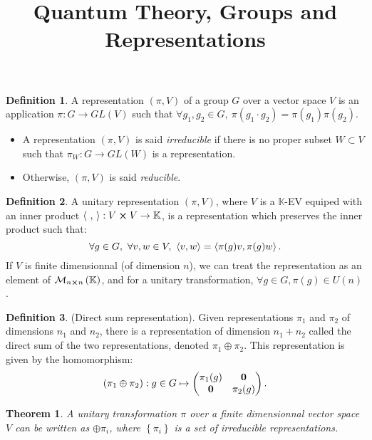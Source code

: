\documentclass[11pt,a4paper]{article}
\title{Quantum Theory, Groups and Representations}
\newtheorem*{theorem}{Theorem}
\theoremstyle{definition}
\newtheorem{definition}{Definition}[section]
\numberwithin{equation}{section}
\begin{document}
\maketitle
\begin{definition}
    A representation $\left(\pi,V\right)$ of a group $G$ over a vector space $V$ is an application $\pi:G\rightarrow GL(V)$ such that $\forall g_1,g_2 \in G, \ \pi\left(g_1\cdot g_2\right) = \pi\left(g_1\right) \pi(g_2)$.
    \begin{itemize}
        \item A representation $(\pi,V)$ is said \textit{irreducible} if there is no proper subset $W \subset  V$ such that $\pi_W:G\rightarrow GL(W)$ is a representation.
        \item Otherwise, $(\pi,V)$ is said \textit{reducible}.
    \end{itemize}
\end{definition}
\begin{definition}
    A unitary representation $(\pi,V)$, where $V$ is a $\mathbb{K}$-EV equiped with an inner product $\expval{\ ,\ }:V\cross V \rightarrow \mathbb{K}$, is a representation which preserves the inner product such that:
    \begin{equation*}
        \forall g \in G,\ \forall v,w \in V,\ \expval{v,w} = \expval{\pi(g)v, \pi(g)w}. 
    \end{equation*}
    If $V$ is finite dimensionnal (of dimension $n$), we can treat the representation as an element of $\mathcal{M}_{n \cross n}\left(\mathbb{K}\right)$, and for a unitary transformation, $\forall g\in G, \pi(g) \in U(n)$.
\end{definition}
\begin{definition}
    (Direct sum representation). Given representations $\pi_1$ and $\pi_2$ of dimensions $n_1$ and $n_2$, there is a representation of dimension $n_1+n_2$ called the direct sum of the two representations, denoted $\pi_1 \oplus \pi_2$. This representation is given by the homomorphism:
    \begin{equation*}
        \left(\pi_1 \oplus \pi_2\right):g \in G \mapsto \begin{pmatrix}
            \pi_1(g)& \vb{0}\\
            \vb{0}& \pi_2(g)
        \end{pmatrix}.
    \end{equation*}
\end{definition}
\begin{theorem}
    A unitary transformation $\pi$ over a finite dimensionnal vector space $V$ can be written as $\oplus \pi_i $, where $\left\{\pi_i\right\}$ is a set of irreducible representations.
\end{theorem}
\end{document}
